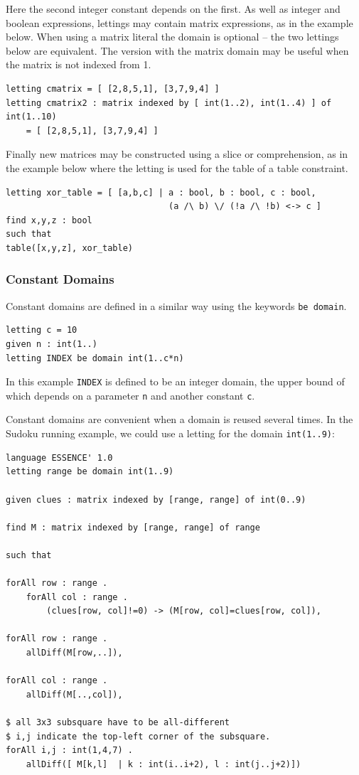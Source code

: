\documentclass[a4paper]{article}
\begin{document}
Here the second integer constant depends on the first. As well as integer and
boolean expressions, lettings may contain matrix expressions, as in the
example below. When using a matrix literal the domain is optional -- the two 
lettings below are equivalent.  The version with the matrix domain may be useful when
the matrix is not indexed from 1. 

\begin{verbatim}
letting cmatrix = [ [2,8,5,1], [3,7,9,4] ]
letting cmatrix2 : matrix indexed by [ int(1..2), int(1..4) ] of int(1..10) 
    = [ [2,8,5,1], [3,7,9,4] ]
\end{verbatim}

Finally new matrices may be constructed using a slice or comprehension, as in the example below
where the letting is used for the table of a table constraint. 

\begin{verbatim}
letting xor_table = [ [a,b,c] | a : bool, b : bool, c : bool, 
                                (a /\ b) \/ (!a /\ !b) <-> c ]
find x,y,z : bool
such that
table([x,y,z], xor_table)
\end{verbatim}


\subsubsection{Constant Domains}

Constant domains are defined in a similar way using the keywords {\tt be domain}.

\begin{verbatim}
letting c = 10
given n : int(1..)
letting INDEX be domain int(1..c*n)
\end{verbatim}

In this example {\tt INDEX} is defined to be an integer domain, the upper bound of
which depends on a parameter \texttt{n} and another constant \texttt{c}. 

Constant domains are convenient when a domain is reused several times. In the 
Sudoku running example, we could use a letting for the domain \texttt{int(1..9)}:

\begin{verbatim}
language ESSENCE' 1.0
letting range be domain int(1..9)

given clues : matrix indexed by [range, range] of int(0..9)

find M : matrix indexed by [range, range] of range

such that

forAll row : range .
    forAll col : range .
        (clues[row, col]!=0) -> (M[row, col]=clues[row, col]),

forAll row : range .
    allDiff(M[row,..]),

forAll col : range .
    allDiff(M[..,col]),	 

$ all 3x3 subsquare have to be all-different
$ i,j indicate the top-left corner of the subsquare. 
forAll i,j : int(1,4,7) .
    allDiff([ M[k,l]  | k : int(i..i+2), l : int(j..j+2)])
\end{verbatim}
\end{document}
